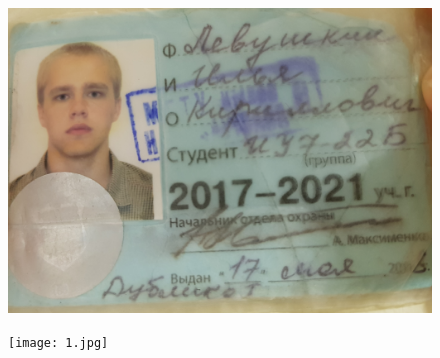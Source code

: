 \documentclass[a4paper,12pt]{article}
\begin{document}
	
	\begin{figure}[h!]
		\begin{center}
			{\includegraphics[scale = 0.15]{photo_ilya.jpg}}
			\label{ilya}
		\end{center}
	\end{figure}

	\begin{figure}[h!]
		\begin{center}
			{\texttt{[image: 1.jpg]}}
			\label{1}
		\end{center}
	\end{figure}
	
	\newpage
	
\end{document}
